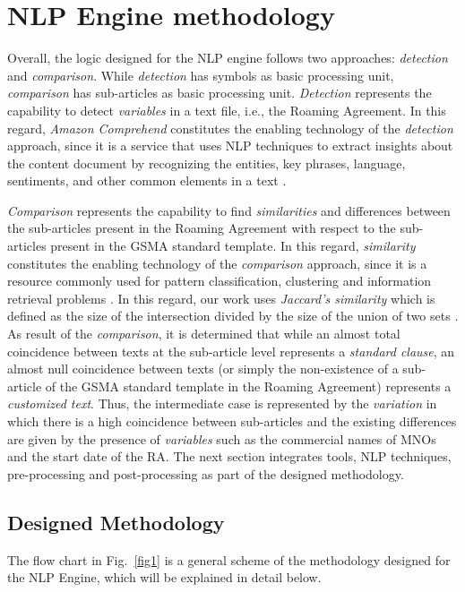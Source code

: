 \documentclass[conference]{style/IEEEtran}
\begin{document}
\section{NLP Engine methodology}
Overall, the logic designed for the NLP engine follows two approaches: \textit{detection} and \textit{comparison}. While \textit{detection} has symbols as basic processing unit, \textit{comparison} has sub-articles as basic processing unit. \textit{Detection} represents the capability to detect \textit{variables} in a text file, i.e., the Roaming Agreement. In this regard, \textit{Amazon Comprehend} constitutes the enabling technology of the \textit{detection} approach, since it is a service that uses NLP techniques to extract insights about the content document by recognizing  the  entities,  key  phrases,  language,  sentiments,  and  other  common  elements  in  a  text \cite{AWS2021}.

\textit{Comparison} represents the capability to find \textit{similarities} and differences between the sub-articles present in the Roaming Agreement with respect to the sub-articles present in the GSMA standard template. In this regard, \textit{similarity} constitutes the enabling technology of the \textit{comparison} approach, since it is a resource commonly used for pattern classification, clustering and information retrieval problems \cite{7429408}. In this regard, our work uses  \textit{Jaccard's similarity} which is defined as the size of the intersection divided by the size of the union of two sets \cite{Gupta2018}. As result of the \textit{comparison}, it is determined that while an almost total coincidence between texts at the sub-article level represents a \textit{standard clause}, an almost null coincidence between texts (or simply the non-existence of a sub-article of the GSMA standard template in the Roaming Agreement) represents a \textit{customized text}. Thus, the intermediate case is represented by the \textit{variation} in which there is a high coincidence between sub-articles and the existing differences are given by the presence of \textit{variables} such as the commercial names of MNOs and the start date of the RA. The next section integrates tools, NLP techniques, pre-processing and post-processing as part of the designed methodology.

\subsection{Designed Methodology}
The flow chart in Fig.~\ref{fig1} is a general scheme of the methodology designed for the NLP Engine, which will be explained in detail below.
\end{document}
